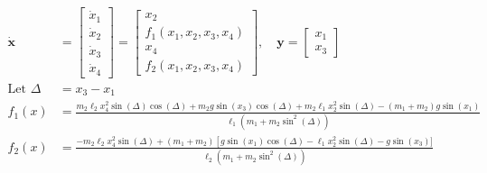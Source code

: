\documentclass[border=0pt]{standalone}
\begin{document}
\noindent
\begin{minipage}{7.5cm}
  \begin{align*}
    \dot{\mathbf{x}} &=
    \begin{bmatrix}
      \dot{x}_1 \\
      \dot{x}_2 \\
      \dot{x}_3 \\
      \dot{x}_4
    \end{bmatrix}
    =
    \begin{bmatrix}
      x_2 \\
      f_1(x_1, x_2, x_3, x_4) \\
      x_4 \\
      f_2(x_1, x_2, x_3, x_4)
    \end{bmatrix}, \quad
    \mathbf{y} = 
    \begin{bmatrix}
      x_1 \\
      x_3
    \end{bmatrix} \\[2ex]
    \text{Let } \Delta &= x_3 - x_1 \\[2ex]
    f_1(x) &= \frac{
      m_2 \ell_2 x_4^2 \sin(\Delta) \cos(\Delta)
      + m_2 g \sin(x_3) \cos(\Delta)
      + m_2 \ell_1 x_2^2 \sin(\Delta)
      - (m_1 + m_2) g \sin(x_1)
    }{
      \ell_1 \left( m_1 + m_2 \sin^2(\Delta) \right)
    } \\[2ex]
    f_2(x) &= \frac{
      - m_2 \ell_2 x_4^2 \sin(\Delta)
      + (m_1 + m_2) \left[
        g \sin(x_1) \cos(\Delta)
        - \ell_1 x_2^2 \sin(\Delta)
        - g \sin(x_3)
      ]
    }{
      \ell_2 \left( m_1 + m_2 \sin^2(\Delta) \right)
    }
  \end{align*}
\end{minipage}
\end{document}
